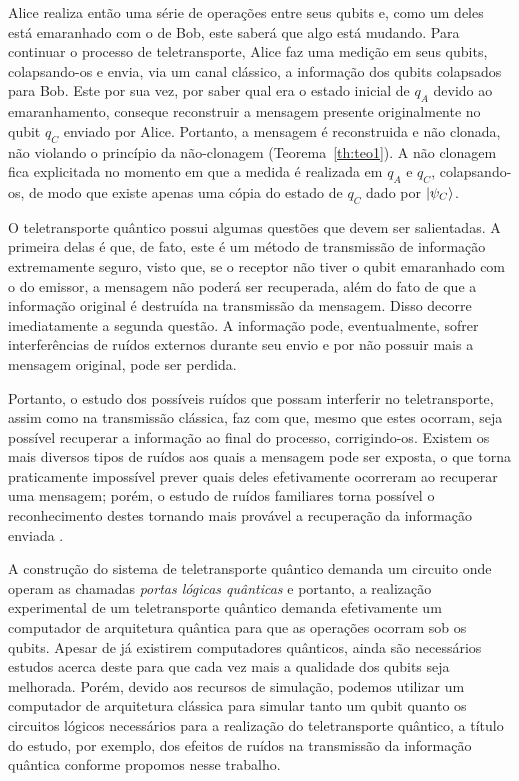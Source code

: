 \documentclass[12pt,oneside,brazil,hidelinks,article,sumario=tradicional,a4paper]{abntex2}
\begin{document}
Alice realiza então uma série de operações entre seus qubits e, como um deles está emaranhado com o de Bob, este saberá que algo está mudando. Para continuar o processo de teletransporte, Alice faz uma medição em seus qubits, colapsando-os e envia, via um canal clássico, a informação dos qubits colapsados para Bob. Este por sua vez, por saber qual era o estado inicial de $q_{A}$ devido ao emaranhamento, conseque reconstruir a mensagem presente originalmente no qubit $q_{C}$ enviado por Alice. Portanto, a mensagem é reconstruida e não clonada, não violando o princípio da não-clonagem (Teorema~\ref{th:teo1}). A não clonagem fica explicitada no momento em que a medida é realizada em $q_{A}$ e $q_{C}$, colapsando-os, de modo que existe apenas uma cópia do estado de $q_{C}$ dado por $\ket{\psi_{C}}$.

O teletransporte quântico possui algumas questões que devem ser salientadas. A primeira delas é que, de fato, este é um método de transmissão de informação extremamente seguro, visto que, se o receptor não tiver o qubit emaranhado com o do emissor, a mensagem não poderá ser recuperada, além do fato de que a informação original é destruída na transmissão da mensagem. Disso decorre imediatamente a segunda questão. A informação pode, eventualmente, sofrer interferências de ruídos externos durante seu envio e por não possuir mais a mensagem original, pode ser perdida.

Portanto, o estudo dos possíveis ruídos que possam interferir no teletransporte, assim como na transmissão clássica, faz com que, mesmo que estes ocorram, seja possível recuperar a informação ao final do processo, corrigindo-os. Existem os mais diversos tipos de ruídos aos quais a mensagem pode ser exposta, o que torna praticamente impossível prever quais deles efetivamente ocorreram ao recuperar uma mensagem; porém, o estudo de ruídos familiares torna possível o reconhecimento destes tornando mais provável a recuperação da informação enviada \cite{fonzar}.

A construção do sistema de teletransporte quântico demanda um circuito onde operam as chamadas \textit{portas lógicas quânticas} e portanto, a realização experimental de um teletransporte quântico demanda efetivamente um computador de arquitetura quântica para que as operações ocorram sob os qubits. Apesar de já existirem computadores quânticos, ainda são necessários estudos acerca deste para que cada vez mais a qualidade dos qubits seja melhorada. Porém, devido aos recursos de simulação, podemos utilizar um computador de arquitetura clássica para simular tanto um qubit quanto os circuitos lógicos necessários para a realização do teletransporte quântico, a título do estudo, por exemplo, dos efeitos de ruídos na transmissão da informação quântica conforme propomos nesse trabalho.
\end{document}
